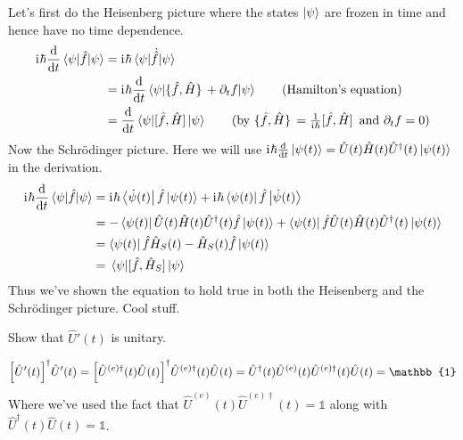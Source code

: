\documentclass[boxes,pages]{homework}
\makeatletter
\newcommand{\iu}{\mathrm{i}\mkern1mu}
\newcommand{\herm}[1]{{{#1}^\dagger}}
\numberwithin{@problem}{section}
\makeatother
\begin{document}
\begin{solution}
	Let's first do the Heisenberg picture where the states $\ket{\psi}$ are frozen in time and hence have no time dependence.
	\begin{align*}
		\iu\hbar\dv{t}\expval{\hat{f}}{\psi} & = \iu\hbar\expval{\dot{\hat{f}}}{\psi}                                                                                                                \\
		                                     & = \iu\hbar\dv{t}\expval{\pb*{\hat{f}}{\hat{H}} + \partial_t f}{\psi} \tag{Hamilton's equation}                                                        \\
		                                     & = \dv{t}\expval{\comm*{\hat{f}}{\hat{H}}}{\psi} \tag{by $\pb*{\hat{f}}{\hat{H}} = \frac{1}{\iu\hbar}\comm*{\hat{f}}{\hat{H}}$ and $\partial_t f = 0$}
	\end{align*}
	Now the Schr\"{o}dinger picture. Here we will use $\iu\hbar\dv{t}\ket{\psi(t)} = \hat{U}(t)\hat{H}(t)\herm{\hat{U}}(t)\ket{\psi(t)}$ in the derivation.
	\begin{align*}
		\iu\hbar\dv{t}\expval{\hat{f}}{\psi} & = \iu\hbar\bra{\dot{\psi}(t)}\hat{f}\ket{\psi(t)} + \iu\hbar\bra{\psi(t)}\hat{f}\ket{\dot{\psi}(t)}                                                \\
		                                     & = -\bra{\psi(t)}\hat{U}(t)\hat{H}(t)\herm{\hat{U}}(t)\hat{f}\ket{\psi(t)} + \bra{\psi(t)}\hat{f}\hat{U}(t)\hat{H}(t)\herm{\hat{U}}(t)\ket{\psi(t)} \\
		                                     & = \bra{\psi(t)}\hat{f}\hat{H}_S(t) - \hat{H}_S(t)\hat{f}\ket{\psi(t)}                                                                              \\
		                                     & = \expval{\comm*{\hat{f}}{\hat{H}_S}}{\psi}
	\end{align*}
	Thus we've shown the equation to hold true in both the Heisenberg and the Schr\"odinger picture. Cool stuff.
\end{solution}

\begin{problem}
Show that $\hat{U}'(t)$ is unitary.
\end{problem}

\begin{solution}
	\begin{equation*}
		\herm{\qty[\hat{U}'(t)]}\hat{U}'(t) = \herm{\qty[\hat{U}^{(e)\dagger}(t)\hat{U}(t)]}\hat{U}^{(e)\dagger}(t)\hat{U}(t) = \herm{\hat{U}}(t)\hat{U}^{(e)}(t)\hat{U}^{(e)\dagger}(t)\hat{U}(t) = \mathbb{1}
	\end{equation*}
	Where we've used the fact that $\hat{U}^{(e)}(t)\hat{U}^{(e)\dagger}(t) = \mathbb{1}$ along with $\herm{\hat{U}}(t)\hat{U}(t) = \mathbb{1}$.
\end{solution}
\end{document}
